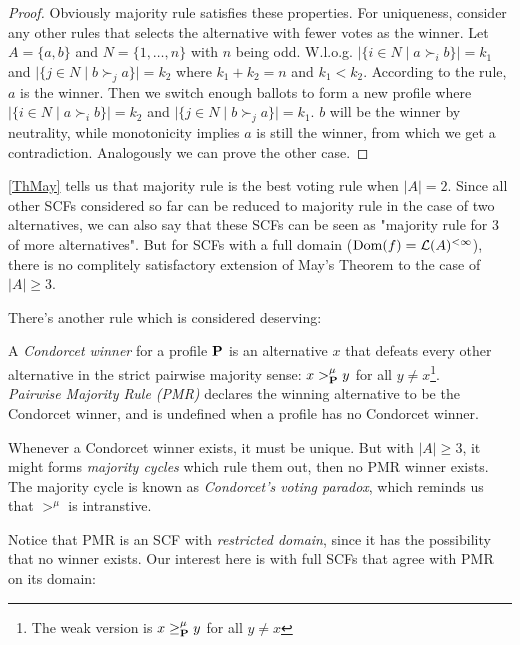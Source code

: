 \begin{proof}
    Obviously majority rule satisfies these properties. For uniqueness, consider any other rules that selects the alternative with fewer votes as the winner. Let $A = \{a,b\}$ and $N = \{1,\dots,n\}$ with $n$ being odd. W.l.o.g. $|\{i \in N\;|\; a \succ_i b\}| = k_1$ and $|\{j \in N\;|\; b \succ_j a\}| = k_2$ where $k_1 + k_2 = n$ and $k_1 < k_2$. According to the rule, $a$ is the winner. Then we switch enough ballots to form a new profile where $|\{i \in N\;|\; a \succ_i b\}| = k_2$ and $|\{j \in N\;|\; b \succ_j a\}| = k_1$. $b$ will be the winner by neutrality, while monotonicity implies $a$ is still the winner, from which we get a contradiction. Analogously we can prove the other case.
\end{proof}

\cref{ThMay} tells us that majority rule is the best voting rule when $|A| = 2$. Since all other SCFs considered so far can be reduced to majority rule in the case of two alternatives, we can also say that these SCFs can be seen as "majority rule for 3 of more alternatives". But for SCFs with a full domain ($\mathrm{Dom}(f) = \mathcal{L}(A)^{<\infty}$), there is no complitely satisfactory extension of May's Theorem to the case of $|A| \geq 3$.

There's another rule which is considered deserving:

\begin{definition}
    A \textit{Condorcet winner} for a profile $\mathbf{P}$ is an alternative $x$ that defeats every other alternative in the strict pairwise majority sense: $x >^\mu_{\mathbf{P}} y$ for all $y \neq x$\footnote{The weak version is $x \geq^\mu_{\mathbf{P}} y$ for all $y \neq x$}.\\
    \textit{Pairwise Majority Rule (PMR)} declares the winning alternative to be the Condorcet winner, and is undefined when a profile has no Condorcet winner.
\end{definition}

Whenever a Condorcet winner exists, it must be unique. But with $|A| \geq 3$, it might forms \textit{majority cycles} which rule them out, then no PMR winner exists. The majority cycle is known as \textit{Condorcet's voting paradox}, which reminds us that $>^\mu$ is intranstive.

Notice that PMR is an SCF with \textit{restricted domain}, since it has the possibility that no winner exists. Our interest here is with full SCFs that agree with PMR on its domain:

